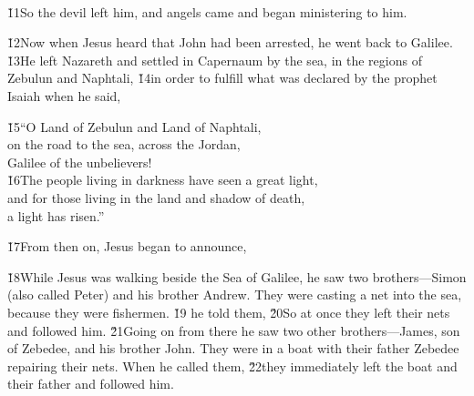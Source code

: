 \begin{poetry}
\poeml {} \\
\poemll    {}
\end{poetry}

\v{11}So the devil left him, and angels came and began ministering to him.

\v{12}Now when Jesus heard that John had been arrested, he went back to Galilee. \v{13}He left Nazareth and settled in Capernaum by the sea, in the regions of Zebulun and Naphtali, \v{14}in order to fulfill what was declared by the prophet Isaiah when he said,

\begin{poetry}
\poeml \v{15}``O Land of Zebulun and Land of Naphtali, \\
\poemll    on the road to the sea, across the Jordan, \\
\poemlll       Galilee of the unbelievers! \\
\poeml \v{16}The people living in darkness have seen a great light, \\
\poemll    and for those living in the land and shadow of death, \\
\poemlll       a light has risen.''
\end{poetry}

\v{17}From then on, Jesus began to announce, 

\v{18}While Jesus was walking beside the Sea of Galilee, he saw two brothers---Simon (also called Peter) and his brother Andrew. They were casting a net into the sea, because they were fishermen. \v{19} he told them, \v{20}So at once they left their nets and followed him. \v{21}Going on from there he saw two other brothers---James, son of Zebedee, and his brother John. They were in a boat with their father Zebedee repairing their nets. When he called them, \v{22}they immediately left the boat and their father and followed him.

